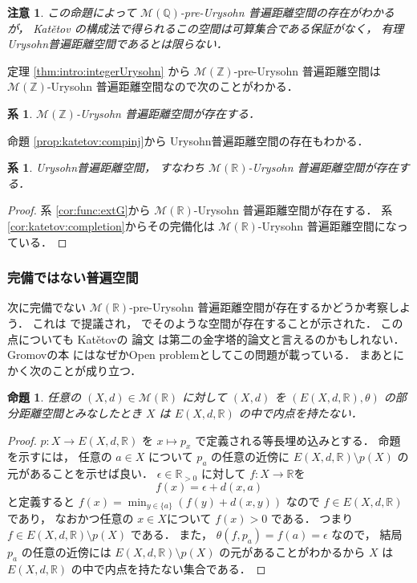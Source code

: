 \documentclass[leqno, 12pt]{jsarticle}
\newtheorem{prop}[thm]{命題}
\newtheorem{cor}[thm]{系}
\newtheorem*{rmk}{注意}
\newcommand{\zz}{\mathbb{Z}}
\newcommand{\qq}{\mathbb{Q}}
\newcommand{\rr}{\mathbb{R}}
\begin{document}
\begin{rmk}
この命題によって
$\mathscr{M}(\qq)$-pre-Urysohn
普遍距離空間の存在がわかるが，
Kat\v{e}tov
の構成法で得られるこの空間は可算集合である保証がなく，
有理Urysohn普遍距離空間であるとは限らない．
\end{rmk}



定理 
\ref{thm:intro:integerUrysohn}
から
$\mathscr{M}(\zz)$-pre-Urysohn
普遍距離空間は
$\mathscr{M}(\zz)$-Urysohn
普遍距離空間なので次のことがわかる．
\begin{cor}\label{cor:ext-z}
$\mathscr{M}(\zz)$-Urysohn
普遍距離空間が存在する．
\end{cor}

命題 
\ref{prop:katetov:compinj}から
Urysohn普遍距離空間の存在もわかる．
\begin{cor}\label{cor:kat-ury}
Urysohn普遍距離空間，
すなわち
$\mathscr{M}(\rr)$-Urysohn
普遍距離空間が存在する．
\end{cor}
\begin{proof}
系 
\ref{cor:func:extG}から
$\mathscr{M}(\rr)$-Urysohn
普遍距離空間が存在する．
系 
\ref{cor:katetov:completion}からその完備化は
$\mathscr{M}(\rr)$-Urysohn
普遍距離空間になっている．
\end{proof}

\subsubsection{完備ではない普遍空間}
次に完備でない
$\mathscr{M}(\rr)$-pre-Urysohn
普遍距離空間が存在するかどうか考察しよう．
これは 
\cite{Ury2}
で提議され，
\cite{Ka}
でそのような空間が存在することが示された．
この点についても
Kat\v{e}tovの
論文 
\cite{Ka}
は第二の金字塔的論文と言えるのかもしれない．
Gromovの本 
\cite{Greenbook}
にはなぜかOpen problemとしてこの問題が載っている．
まあとにかく次のことが成り立つ．
\begin{prop}\label{peop:naitennasi}
任意の
$(X, d)\in \mathscr{M}(\rr)$
に対して
$(X, d)$
を
$(E(X, d, \rr), \theta)$
の部分距離空間とみなしたとき
$X$
は
$E(X, d, \rr)$
の中で内点を持たない．
\end{prop}
\begin{proof}
$p\colon X\to E(X, d, \rr)$
を
 $x\mapsto p_{x}$
 で定義される等長埋め込みとする．
命題を示すには，
任意の
$a\in X$
について
$p_{a}$
の任意の近傍に
$E(X, d, \rr)\setminus p(X)$
の元があることを示せば良い．
$\epsilon\in \rr_{>0}$
に対して
$f\colon X\to \rr$を
\[
f(x)=\epsilon+d(x, a)
\]
と定義すると
$f(x)=\min_{y\in \{a\}}(f(y)+d(x, y))$
なので
$f\in E(X, d, \rr)$
であり，
なおかつ任意の
$x\in X$について
$f(x)>0$
である．
つまり
$f\in E(X, d, \rr)\setminus p(X)$
である．
また，
$\theta(f, p_a)=f(a)=\epsilon$
なので，
結局
$p_{a}$
の任意の近傍には
$E(X, d, \rr)\setminus p(X)$
の元があることがわかるから
$X$
は
$E(X, d, \rr)$
の中で内点を持たない集合である．
\end{proof}
\end{document}

